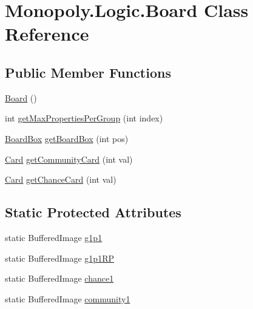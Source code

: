 \hypertarget{class_monopoly_1_1_logic_1_1_board}{}\section{Monopoly.\+Logic.\+Board Class Reference}
\label{class_monopoly_1_1_logic_1_1_board}
\subsection*{Public Member Functions}
\begin{DoxyCompactItemize}
\item 
\hyperlink{class_monopoly_1_1_logic_1_1_board_a6167b16558607aa3fc71cf3f3fa146ae}{Board} ()
\item 
int \hyperlink{class_monopoly_1_1_logic_1_1_board_a8cb936eb34bc5fdd5bbe0a4105c0be29}{get\+Max\+Properties\+Per\+Group} (int index)
\item 
\hyperlink{class_monopoly_1_1_logic_1_1_board_box}{Board\+Box} \hyperlink{class_monopoly_1_1_logic_1_1_board_a836d88dbde44833965456754821edf96}{get\+Board\+Box} (int pos)
\item 
\hyperlink{class_monopoly_1_1_logic_1_1_card}{Card} \hyperlink{class_monopoly_1_1_logic_1_1_board_abc388b28666367962233ac118d4d744f}{get\+Community\+Card} (int val)
\item 
\hyperlink{class_monopoly_1_1_logic_1_1_card}{Card} \hyperlink{class_monopoly_1_1_logic_1_1_board_a077b7d4572891ce441be503451725e8d}{get\+Chance\+Card} (int val)
\end{DoxyCompactItemize}
\subsection*{Static Protected Attributes}
\begin{DoxyCompactItemize}
\item 
static Buffered\+Image \hyperlink{class_monopoly_1_1_logic_1_1_board_a79ef8aae1c6b842096b29f3db5080423}{g1p1}
\item 
static Buffered\+Image \hyperlink{class_monopoly_1_1_logic_1_1_board_aaeeda9f5c80e5ed76e67289cb3f22ea7}{g1p1\+RP}
\item 
static Buffered\+Image \hyperlink{class_monopoly_1_1_logic_1_1_board_a06ab408e2e521277d7ef90c5b1129939}{chance1}
\item 
static Buffered\+Image \hyperlink{class_monopoly_1_1_logic_1_1_board_a5cb4d4c2e50425ce6e342d8c35e4ed0f}{community1}
\end{DoxyCompactItemize}
